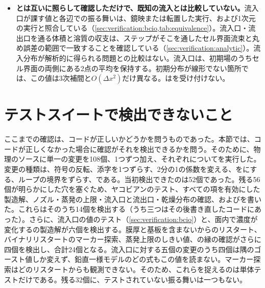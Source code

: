 \begin{itemize}
  \item \textbf{とは互いに照らして確認しただけで、既知の流入とは比較していない。}流入口が課す値と各辺での振る舞いは、鏡映または転置した実行、および1次元の実行と照合している（\cref{sec:verification:bcio,tab:equivalence}）。流入口・流出口を通る体積と溶質の収支は、ステップがそこを通したセル界面流束と丸め誤差の範囲で一致することを確認している（\cref{sec:verification:analytic}）。流入分布が解析的に得られる問題との比較はない。流入口は、初期場のうちセル界面の両側にある2点の平均を保持する。初期分布が線形でない箇所では、この値は3次補間と$O(\Delta x^2)$だけ異なる。はを受け付けない。
\end{itemize}

\section{テストスイートで検出できないこと}
\label{sec:notverified:mutation}

ここまでの確認は、コードが正しいかどうかを問うものであった。本節では、コードが正しくなかった場合に確認がそれを検出できるかを問う。そのために、物理のソースに単一の変更を108個、1つずつ加え、それぞれについてを実行した。変更の種類は、符号の反転、添字を1つずらす、2分の1の係数を変える、\code{+=}を\code{=}にする、ループの境界をずらす、である。当初検出できたのは52個であった。残る56個が明らかにした穴を塞ぐため、ヤコビアンのテスト、すべての項を有効にした製造解、ノズル・蒸発の上限・流入口と流出口・乾燥分布の確認、およびを書いた。これらはそのうち14個を検出する（うち三つはその後書き直したコードにあった）。さらに、流入口の値のテスト（\cref{sec:verification:bcio}）と、面内で濃度が変化するの製造解が六個を検出する。膜厚と基板を含まないからのリスタート、バイナリリスタートのマーカー探索、蒸発上限のしきい値、の縁の確認がさらに四個を検出し、合計24個となる。流入口に対する五個の変更のうち四個は隅のゴースト値しか変えず、鉛直一様モデルのどの式もこの値を読まない。マーカー探索はどのリスタートからも観測できない。そのため、これらを捉えるのは単体テストだけである。残る32個に、テストされていない振る舞いは一つもない。


